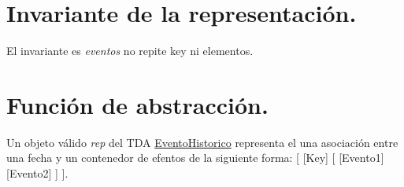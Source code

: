 \hypertarget{repEventoHistorico_invEventoHistorico}{}\section{Invariante de la representación.}\label{repEventoHistorico_invEventoHistorico}
El invariante es {\itshape eventos} no repite key ni elementos.\hypertarget{repEventoHistorico_faEvento}{}\section{Función de abstracción.}\label{repEventoHistorico_faEvento}
Un objeto válido {\itshape rep} del T\+DA \hyperlink{classEventoHistorico}{Evento\+Historico} representa el una asociación entre una fecha y un contenedor de efentos de la siguiente forma\+: \mbox{[} \mbox{[}Key\mbox{]} \mbox{[} \mbox{[}Evento1\mbox{]}\mbox{[}Evento2\mbox{]} \mbox{]} \mbox{]}. 